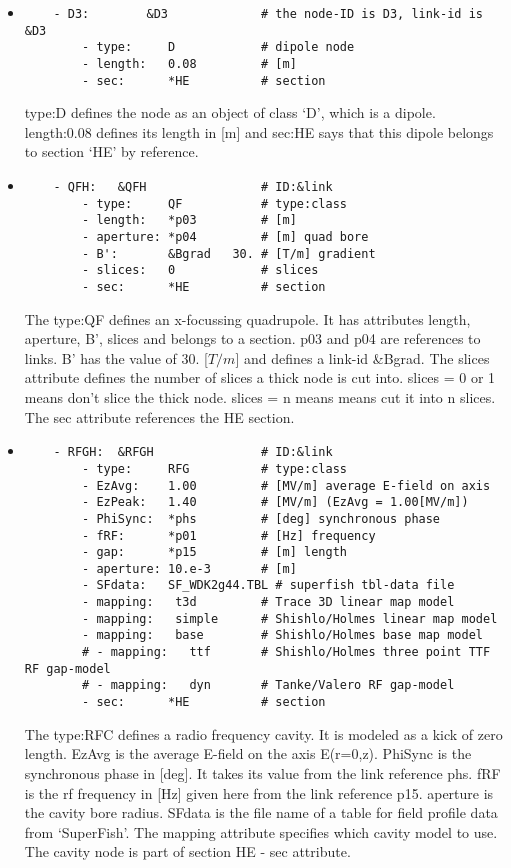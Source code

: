 \documentclass[10pt]{article}
\begin{document}
\begin{itemize}
\item
\begin{verbatim}
    - D3:        &D3             # the node-ID is D3, link-id is &D3
        - type:     D            # dipole node
        - length:   0.08         # [m]
        - sec:      *HE          # section
\end{verbatim}
type:D defines the node as an object of class `D', which is a dipole. length:0.08 defines its length in [m] and sec:\textasteriskcentered HE
says that this dipole belongs to section `HE' by reference.
\item
\begin{verbatim}
    - QFH:   &QFH                # ID:&link
        - type:     QF           # type:class
        - length:   *p03         # [m]
        - aperture: *p04         # [m] quad bore
        - B':       &Bgrad   30. # [T/m] gradient
        - slices:   0            # slices
        - sec:      *HE          # section
\end{verbatim}
The type:QF defines an x-focussing quadrupole. It has attributes length, aperture, B', slices and belongs to a section. 
\textasteriskcentered p03 and \textasteriskcentered p04 are references to links. B' has the value of 30. [$T/m$] and defines a link-id \&Bgrad. The slices attribute defines the number of slices a thick node is cut into. slices = 0 or 1 means don't slice the thick
node. slices = n means means cut it into n slices. The sec attribute references the HE section.
\item
\begin{verbatim}
    - RFGH:  &RFGH               # ID:&link
        - type:     RFG          # type:class
        - EzAvg:    1.00         # [MV/m] average E-field on axis
        - EzPeak:   1.40         # [MV/m] (EzAvg = 1.00[MV/m])
        - PhiSync:  *phs         # [deg] synchronous phase
        - fRF:      *p01         # [Hz] frequency
        - gap:      *p15         # [m] length
        - aperture: 10.e-3       # [m]
        - SFdata:   SF_WDK2g44.TBL # superfish tbl-data file
        - mapping:   t3d         # Trace 3D linear map model
        - mapping:   simple      # Shishlo/Holmes linear map model
        - mapping:   base        # Shishlo/Holmes base map model
        # - mapping:   ttf       # Shishlo/Holmes three point TTF RF gap-model
        # - mapping:   dyn       # Tanke/Valero RF gap-model
        - sec:      *HE          # section
\end{verbatim}
The type:RFC defines a radio frequency cavity. It is modeled as a kick of zero length. EzAvg is the average
E-field on the axis E(r=0,z). PhiSync is the synchronous phase in [deg]. It takes its value from the link
reference \textasteriskcentered phs. fRF is the rf frequency in [Hz] given here from the link reference 
\textasteriskcentered p15. aperture is the cavity bore radius. SFdata is the file name of a table for
field profile data from `SuperFish'. The mapping attribute specifies which cavity model to use. The cavity
node is part of section HE - sec attribute.


\end{itemize}
\end{document}
